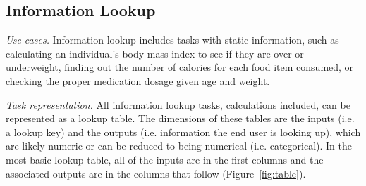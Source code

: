 \documentclass{sig-alternate}
\begin{document}



\subsection{Information Lookup}
\label{sec:lookup}

\emph{Use cases.}
Information lookup includes tasks with static information, such as calculating an individual's body mass index to see if they are over or underweight, finding out the number of calories for each food item consumed, or checking the proper medication dosage given age and weight.

\emph{Task representation.}
All information lookup tasks, calculations included, can be represented as a lookup table. 
The dimensions of these tables are the inputs (i.e. a lookup key) and the outputs (i.e. information the end user is looking up), which are likely numeric or can be reduced to being numerical (i.e. categorical). In the most basic lookup table, all of the inputs are in the first columns and the associated outputs are in the columns that follow (Figure~\ref{fig:table}).
\end{document}
